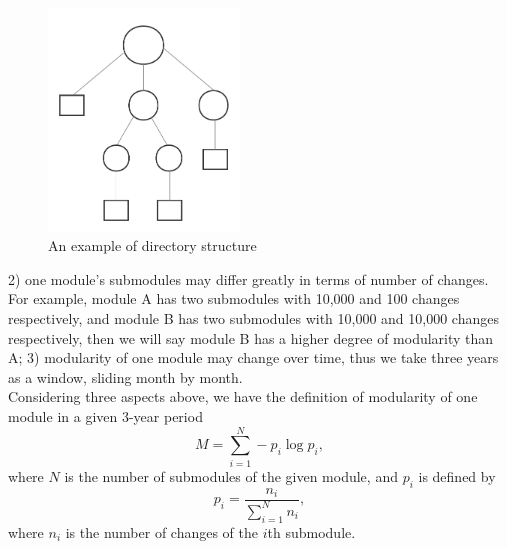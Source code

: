 \documentclass{sig-alternate-05-2015}
\begin{document}
\begin{figure}
\centering
\includegraphics[height=2.33in, width=2in]{./pics/dir-struct.pdf}
\caption{An example of directory structure}
\label{fig:dir_struct}
\end{figure}

2) one module's submodules may differ greatly in terms of number of changes. For example, module A has two submodules with 10,000 and 100 changes respectively, and module B has two submodules with 10,000 and 10,000 changes respectively, then we will say module B has a higher degree of modularity than A;
3) modularity of one module may change over time, thus we take three years as a window, sliding month by month.\\

Considering three aspects above, we have the definition of modularity of one module in a given 3-year period
\begin{equation}
\label{def_modularity}
M = \sum\limits_{i=1}^{N} - p_{i} \log p_{i},
\end{equation}
where $N$ is the number of submodules of the given module, and $p_{i}$ is defined by
\begin{equation}
\label{def_pi}
p_{i} = \frac{n_{i}}{\sum\limits_{i=1}^{N} n_{i}},
\end{equation}
where $n_{i}$ is the number of changes of the $i$th submodule.
\end{document}
